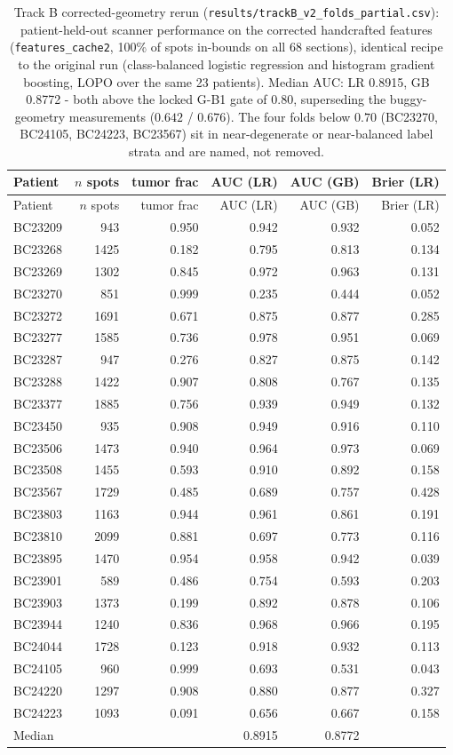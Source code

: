 \begin{longtable}{lrrrrr}
\caption{Track B corrected-geometry rerun (\texttt{results/trackB\_v2\_folds\_partial.csv}):
patient-held-out scanner performance on the corrected handcrafted features
(\texttt{features\_cache2}, 100\% of spots in-bounds on all 68 sections), identical
recipe to the original run (class-balanced logistic regression and histogram gradient
boosting, LOPO over the same 23 patients). Median AUC: LR 0.8915, GB 0.8772
- both above the locked G-B1 gate of $0.80$, superseding the buggy-geometry measurements
($0.642$ / $0.676$). The four folds below $0.70$ (BC23270, BC24105, BC24223, BC23567) sit
in near-degenerate or near-balanced label strata and are named, not removed.}\label{tab:trackb-v2}\\
\toprule
Patient & $n$ spots & tumor frac & AUC (LR) & AUC (GB) & Brier (LR) \\
\midrule
\endfirsthead
\toprule
Patient & $n$ spots & tumor frac & AUC (LR) & AUC (GB) & Brier (LR) \\
\midrule
\endhead
BC23209 & 943 & 0.950 & 0.942 & 0.932 & 0.052 \\
BC23268 & 1425 & 0.182 & 0.795 & 0.813 & 0.134 \\
BC23269 & 1302 & 0.845 & 0.972 & 0.963 & 0.131 \\
BC23270 & 851 & 0.999 & 0.235 & 0.444 & 0.052 \\
BC23272 & 1691 & 0.671 & 0.875 & 0.877 & 0.285 \\
BC23277 & 1585 & 0.736 & 0.978 & 0.951 & 0.069 \\
BC23287 & 947 & 0.276 & 0.827 & 0.875 & 0.142 \\
BC23288 & 1422 & 0.907 & 0.808 & 0.767 & 0.135 \\
BC23377 & 1885 & 0.756 & 0.939 & 0.949 & 0.132 \\
BC23450 & 935 & 0.908 & 0.949 & 0.916 & 0.110 \\
BC23506 & 1473 & 0.940 & 0.964 & 0.973 & 0.069 \\
BC23508 & 1455 & 0.593 & 0.910 & 0.892 & 0.158 \\
BC23567 & 1729 & 0.485 & 0.689 & 0.757 & 0.428 \\
BC23803 & 1163 & 0.944 & 0.961 & 0.861 & 0.191 \\
BC23810 & 2099 & 0.881 & 0.697 & 0.773 & 0.116 \\
BC23895 & 1470 & 0.954 & 0.958 & 0.942 & 0.039 \\
BC23901 & 589 & 0.486 & 0.754 & 0.593 & 0.203 \\
BC23903 & 1373 & 0.199 & 0.892 & 0.878 & 0.106 \\
BC23944 & 1240 & 0.836 & 0.968 & 0.966 & 0.195 \\
BC24044 & 1728 & 0.123 & 0.918 & 0.932 & 0.113 \\
BC24105 & 960 & 0.999 & 0.693 & 0.531 & 0.043 \\
BC24220 & 1297 & 0.908 & 0.880 & 0.877 & 0.327 \\
BC24223 & 1093 & 0.091 & 0.656 & 0.667 & 0.158 \\
\midrule
Median & & & 0.8915 & 0.8772 & \\
\bottomrule
\end{longtable}
